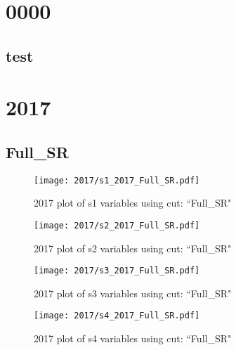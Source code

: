\documentclass{article}
\begin{document}
    \graphicspath{ {../../plots/} }
    \listoffigures
    \section*{0000}
      \subsection*{test}
    \section*{2017}
      \subsection*{Full\_SR}
                        \begin{figure}[H]
                            \centering
                            \caption{2017 plot of s1 variables using cut: ``Full\_SR"}
                            \texttt{[image: 2017/s1\_2017\_Full\_SR.pdf]}
                        \end{figure}    
                        \begin{figure}[H]
                            \centering
                            \caption{2017 plot of s2 variables using cut: ``Full\_SR"}
                            \texttt{[image: 2017/s2\_2017\_Full\_SR.pdf]}
                        \end{figure}    
                        \begin{figure}[H]
                            \centering
                            \caption{2017 plot of s3 variables using cut: ``Full\_SR"}
                            \texttt{[image: 2017/s3\_2017\_Full\_SR.pdf]}
                        \end{figure}    
                        \begin{figure}[H]
                            \centering
                            \caption{2017 plot of s4 variables using cut: ``Full\_SR"}
                            \texttt{[image: 2017/s4\_2017\_Full\_SR.pdf]}
                        \end{figure}    
\end{document}
